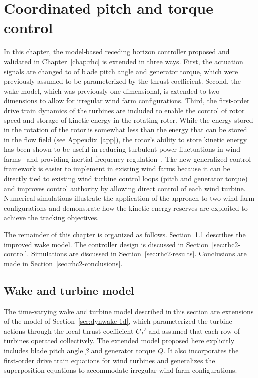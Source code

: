 \chapter{Coordinated pitch and torque control}
\label{chap:rhc2}

In this chapter, the model-based receding horizon controller proposed and validated in Chapter~\ref{chap:rhc} is extended in three ways. First, the actuation signals are changed to of blade pitch angle and generator torque, which were previously assumed to be parameterized by the thrust coefficient. Second, the wake model, which was previously one dimensional, is extended to two dimensions to  allow for irregular wind farm configurations. Third, the first-order drive train dynamics of the turbines are included to enable the control of rotor speed and storage of kinetic energy in the rotating rotor. While the energy stored in the rotation of the rotor is somewhat less than the energy that can be stored in the flow field (see Appendix~\ref{app}), the rotor's ability to store kinetic energy has been shown to be useful in reducing turbulent power fluctuations in wind farms~\cite{DeRijcke2015a} and providing inertial frequency regulation~\cite{Aho2013a}. The new generalized control framework is easier to implement in existing wind farms because it can be directly tied to existing wind turbine control loops (pitch and generator torque) and improves control authority by allowing direct control of each wind turbine. Numerical simulations illustrate the application of the approach to two wind farm configurations and demonstrate how the kinetic energy reserves are exploited to achieve the tracking objectives.

The remainder of this chapter is organized as follows. Section~\ref{sec:rhc2-model} describes the improved wake model. The controller design is discussed in Section~\ref{sec:rhc2-control}. Simulations are discussed in Section~\ref{sec:rhc2-results}. Conclusions are made in Section~\ref{sec:rhc2-conclusions}.

\section{Wake and turbine model}
\label{sec:rhc2-model}
The time-varying wake and turbine model described in this section are extensions of the model of Section~\ref{sec:dynwake-1d}, which parameterized the turbine actions through the local thrust coefficient $C_T'$ and assumed that each row of turbines operated collectively. The extended model proposed here explicitly includes blade pitch angle $\beta$ and generator torque $Q$. It also incorporates the first-order drive train equations for wind turbines and generalizes the superposition equations to accommodate irregular wind farm configurations.

